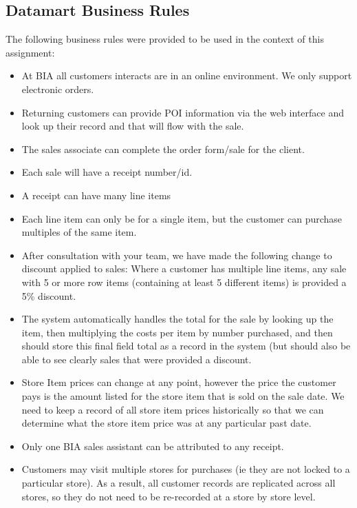 \documentclass{article}
\begin{document}
	
\newpage



    \subsection{Datamart Business Rules}
    The following business rules were provided to be used in the context of this assignment:
    \begin{itemize}
        \item At BIA all customers interacts are in an online environment. We only support electronic orders.
        \item Returning customers can provide POI information via the web interface and look up their record and that will flow with the sale.
        \item The sales associate can complete the order form/sale for the client.
        \item Each sale will have a receipt number/id.
        \item A receipt can have many line items 
        \item Each line item can only be for a single item, but the customer can purchase multiples of the same item.
        \item After consultation with your team, we have made the following change to discount applied to sales: 
        Where a customer has multiple line items, any sale with 5 or more row items (containing at least 5 different items) 
        is provided a 5\% discount.
        \item The system automatically handles the total for the sale by looking up the item, then multiplying the costs 
        per item by number purchased, and then should store this final field total as a record in the system (but should
        also be able to see clearly sales that were provided a discount. 
        \item Store Item prices can change at any point, however the price the customer pays is the amount listed for the
        store item that is sold on the sale date. We need to keep a record of all store item prices historically so that 
        we can determine what the store item price was at any particular past date.
        \item Only one BIA sales assistant can be attributed to any receipt.
        \item Customers may visit multiple stores for purchases (ie they are not locked to a particular store). As a 
        result, all customer records are replicated across all stores, so they do not need to be re-recorded at a 
        store by store level.
    \end{itemize}
   
\end{document}
